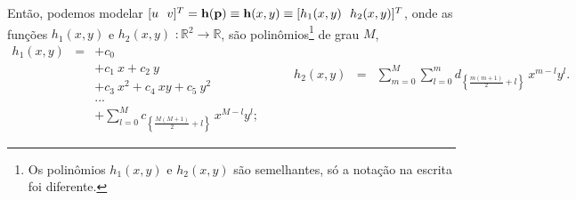 \begin{theorem}
Então, podemos modelar  
$[u~~v]^T = \VECTOR{h}(\VECTOR{p})\equiv \VECTOR{h}(x,y)\equiv [h_1(x,y)~~h_2(x,y) ]^T$, 
onde as funções $h_1(x,y)$ e $h_2(x,y)$ $: \mathbb{R}^2 \rightarrow \mathbb{R}$,
são polinômios\footnote{Os polinômios $h_1(x,y)$ e $h_2(x,y)$ são semelhantes, só a notação na escrita foi diferente.} de grau $M$,
\begin{equation}\label{eq:mapeamento:2}
\begin{matrix}
h_1(x,y) & = & +c_{0}\\
              ~ & ~ & +c_{1}~x + c_{2}~y\\
              ~ & ~ & +c_{3}~x^2 +c_{4}~xy + c_{5}~y^2\\
              ~ & ~ &  ...\\
              ~ & ~ & +\sum \limits_{l=0}^{M}c_{\left\{ \frac{M(M+1)}{2}+l\right\}}~x^{M-l}y^{l};
\end{matrix} 
\qquad
\begin{matrix}
h_2(x,y) & = & \sum \limits_{m=0}^{M} \sum \limits_{l=0}^{m}d_{\left\{ \frac{m(m+1)}{2}+l\right\}}~x^{m-l}y^{l}.
       ~ & ~ & ~\\
       ~ & ~ & ~\\
       ~ & ~ & ~\\
       ~ & ~ & ~\\
       ~ & ~ & ~
\end{matrix}
\end{equation}


\end{theorem}
